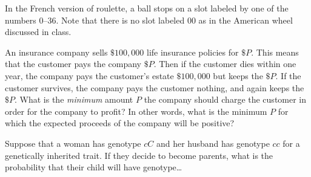 \documentclass[addpoints,12pt]{exam}
\begin{document}
\begin{questions}

\question[12] In the French version of roulette, a ball stops
on a slot labeled by one of the numbers
$0$--$36$. Note that there is no slot labeled
$00$ as in the American wheel discussed in class.

\question[12] An insurance company sells $\$100,000$
life insurance policies for $\$P$. This means that the customer
pays the company $\$P$. Then
if the customer dies within one year, the company
pays the customer's estate $\$100,000$ but keeps the $\$P$.
If the customer survives, the company pays the customer nothing, and again
keeps the $\$P$. What is the {\em minimum} amount $P$ the
company should charge the customer in order
for the company to profit? In other words, what is the minimum
$P$ for which the expected proceeds of the company will be positive?

\question[12]
Suppose that a woman has genotype $cC$
and her husband has genotype $cc$ for a
genetically inherited trait.
If they decide to become parents,
what is the probability that their child will
have genotype\dots
{}


\end{questions}
\end{document}
